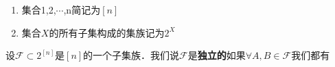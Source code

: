 
\begin{enumerate}{一些记号}
\item 集合{1,2,$\cdots$,n}简记为$[n]$
\item 集合$X$的所有子集构成的集族记为$2^{X}$
\end{enumerate}

\begin{definition}{}
设$\mathcal{F}\subset 2^{[n]}$是$[n]$的一个子集族．我们说$\mathcal{F}$是\textbf{独立的}如果$\forall A,B\in \mathcal{F}$我们都有
\end{definition}